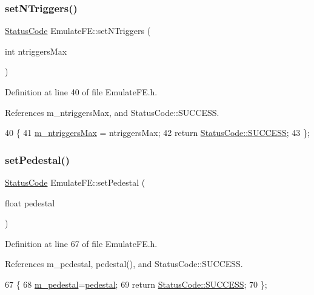 \subsubsection{\texorpdfstring{set\+N\+Triggers()}{setNTriggers()}}
{\footnotesize\ttfamily \hyperlink{classStatusCode}{Status\+Code} Emulate\+F\+E\+::set\+N\+Triggers (\begin{DoxyParamCaption}\item[{int}]{ntriggers\+Max }\end{DoxyParamCaption})\hspace{0.3cm}{\ttfamily [inline]}}



Definition at line 40 of file Emulate\+F\+E.\+h.



References m\+\_\+ntriggers\+Max, and Status\+Code\+::\+S\+U\+C\+C\+E\+SS.


\begin{DoxyCode}
40                                             \{
41     \hyperlink{classEmulateFE_a2d473d12faf30f4870458874d70c7f55}{m\_ntriggersMax} = ntriggersMax;
42     \textcolor{keywordflow}{return} \hyperlink{classStatusCode_a6f565cbeadc76d14c72f047e5e85eb4badd0da38d3ba0d922efd1f4619bc37ad8}{StatusCode::SUCCESS};
43   \};
\end{DoxyCode}
\mbox{\label{classEmulateFE_a6328b50231c29fc5a7e6df99a3db3a29}} 
\subsubsection{\texorpdfstring{set\+Pedestal()}{setPedestal()}}
{\footnotesize\ttfamily \hyperlink{classStatusCode}{Status\+Code} Emulate\+F\+E\+::set\+Pedestal (\begin{DoxyParamCaption}\item[{float}]{pedestal }\end{DoxyParamCaption})\hspace{0.3cm}{\ttfamily [inline]}}



Definition at line 67 of file Emulate\+F\+E.\+h.



References m\+\_\+pedestal, pedestal(), and Status\+Code\+::\+S\+U\+C\+C\+E\+SS.


\begin{DoxyCode}
67                                          \{
68     \hyperlink{classEmulateFE_a033996ce759c11305395ac865a6c074a}{m\_pedestal}=\hyperlink{classEmulateFE_a8442db97da7b2a97fe97745e6d8d9161}{pedestal};
69     \textcolor{keywordflow}{return} \hyperlink{classStatusCode_a6f565cbeadc76d14c72f047e5e85eb4badd0da38d3ba0d922efd1f4619bc37ad8}{StatusCode::SUCCESS};
70   \};
\end{DoxyCode}
\mbox{\label{classEmulateFE_ad785934c216c213e504f3db72b53354f}} 
